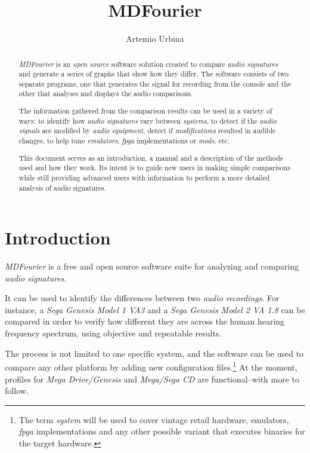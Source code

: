 \documentclass[10pt,a4paper]{report}
\title{MDFourier}
\author{Artemio Urbina}
\newcommand{\ac}[1]{\textit{\acrshort{#1}}}
\begin{document}
	
\begin{titlepage}
	\maketitle
	\thispagestyle{empty}
\end{titlepage}

\begin{abstract}
\textit{MDFourier} is an \textit{open source} software solution created to compare \textit{audio signatures} and generate a series of graphs that show how they differ. The software consists of two separate programs, one that generates the signal for recording from the console and the other that analyses and displays the audio comparisons. 

The information gathered from the comparison results can be used in a variety of ways: to identify how \textit{audio signatures} vary between \textit{systems}, to detect if the \textit{audio signals} are modified by \textit{audio equipment}, detect if \textit{modifications} resulted in audible changes, to help tune \textit{emulators}, \ac{fpga} implementations or \textit{mods}, etc.

This document serves as an introduction, a manual and a description of the methods used and how they work. Its intent is to guide new users in making simple comparisons while still providing advanced users with information to perform a more detailed analysis of audio signatures.
\end{abstract}

\tableofcontents

\chapter{Introduction}

\textit{MDFourier} is a free and open source software suite for analyzing and comparing \textit{audio signatures}.

It can be used to identify the differences between two \textit{audio recordings}.  For instance, a \textit{Sega Genesis Model 1 VA3} and a \textit{Sega Genesis Model 2 VA 1.8} can be compared in order to verify how different they are across the human hearing frequency spectrum, using objective and repeatable results.

The process is not limited to one specific system, and the software can be used to compare any other platform by adding new configuration files.\footnote{The term \textit{system} will be used to cover vintage retail hardware, emulators, \ac{fpga} implementations and any other possible variant that executes binaries for the target hardware.} At the moment, profiles for \textit{Mega Drive/Genesis} and \textit{Mega/Sega CD} are functional--with more to follow.
\end{document}
